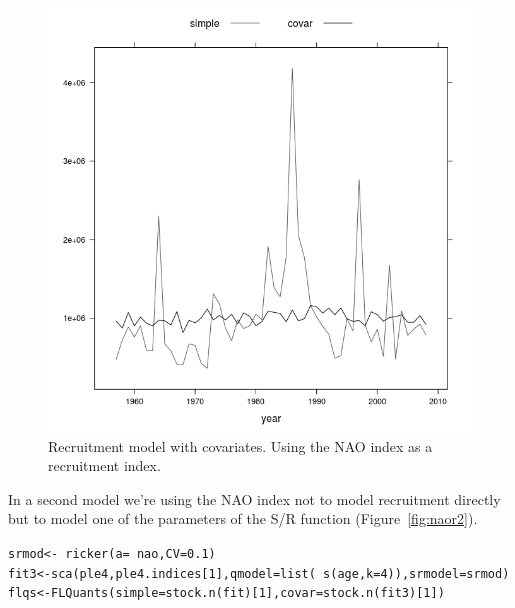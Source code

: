 \documentclass[a4paper,english,10pt]{article}\usepackage[]{graphicx}\usepackage[]{color}
\makeatletter
\newcommand{\hlnum}[1]{\textcolor[rgb]{0.063,0.58,0.627}{#1}}%
\newcommand{\hlopt}[1]{\textcolor[rgb]{0.196,0.196,0.196}{#1}}%
\newcommand{\hlstd}[1]{\textcolor[rgb]{0.196,0.196,0.196}{#1}}%
\newcommand{\hlkwb}[1]{\textcolor[rgb]{0.627,0,0.314}{#1}}%
\newcommand{\hlkwc}[1]{\textcolor[rgb]{0,0.631,0.314}{#1}}%
\newcommand{\hlkwd}[1]{\textcolor[rgb]{0.78,0.227,0.412}{#1}}%
\newenvironment{kframe}{%
 \def\at@end@of@kframe{}%
 \ifinner\ifhmode%
  \def\at@end@of@kframe{\end{minipage}}%
  \begin{minipage}{\columnwidth}%
 \fi\fi%
 \def\FrameCommand##1{\hskip\@totalleftmargin \hskip-\fboxsep
 \colorbox{shadecolor}{##1}\hskip-\fboxsep
     \hskip-\linewidth \hskip-\@totalleftmargin \hskip\columnwidth}%
 \MakeFramed {\advance\hsize-\width
   \@totalleftmargin\z@ \linewidth\hsize
   \@setminipage}}%
 {\par\unskip\endMakeFramed%
 \at@end@of@kframe}
\newenvironment{knitrout}{}{} %
\makeatother
\begin{document}
\begin{knitrout}
\color{fgcolor}\begin{figure}[H]

{\centering \includegraphics[width=.9\linewidth]{figure/naor-1} 

}

\caption[Recruitment model with covariates]{Recruitment model with covariates. Using the NAO index as a recruitment index.}\label{fig:naor}
\end{figure}


\end{knitrout}

In a second model we're using the NAO index not to model recruitment directly but to model one of the parameters of the S/R function (Figure~\ref{fig:naor2}).

\begin{knitrout}
\color{fgcolor}\begin{kframe}
\begin{alltt}
\hlstd{srmod} \hlkwb{<-} \hlopt{~}\hlkwd{ricker}\hlstd{(}\hlkwc{a} \hlstd{=} \hlopt{~}\hlstd{nao,} \hlkwc{CV} \hlstd{=} \hlnum{0.1}\hlstd{)}
\hlstd{fit3} \hlkwb{<-} \hlkwd{sca}\hlstd{(ple4, ple4.indices[}\hlnum{1}\hlstd{],} \hlkwc{qmodel} \hlstd{=} \hlkwd{list}\hlstd{(}\hlopt{~}\hlkwd{s}\hlstd{(age,} \hlkwc{k} \hlstd{=} \hlnum{4}\hlstd{)),} \hlkwc{srmodel} \hlstd{= srmod)}
\hlstd{flqs} \hlkwb{<-} \hlkwd{FLQuants}\hlstd{(}\hlkwc{simple} \hlstd{=} \hlkwd{stock.n}\hlstd{(fit)[}\hlnum{1}\hlstd{],} \hlkwc{covar} \hlstd{=} \hlkwd{stock.n}\hlstd{(fit3)[}\hlnum{1}\hlstd{])}
\end{alltt}
\end{kframe}
\end{knitrout}
\end{document}
